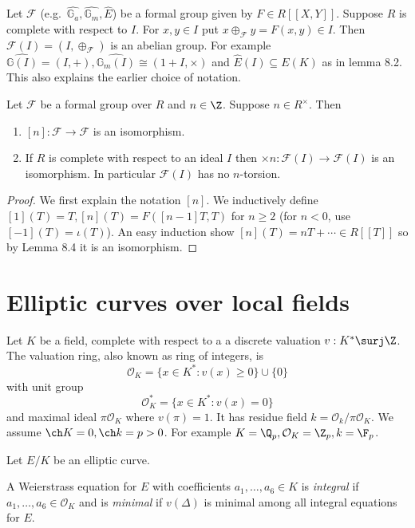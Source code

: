\documentclass[a4paper]{article}
\theoremstyle{definition}
\theoremstyle{theorem}
\renewcommand*{\O}{\mathcal{O}}
\begin{document}
\begin{notation}
  Let \(\mathcal F\) (e.g.\ \(\hat{\mathbb G_a}, \hat{\mathbb G_m}, \hat E\)) be a formal group given by \(F \in R[[X, Y]]\). Suppose \(R\) is complete with respect to \(I\). For \(x, y \in I\) put \(x \oplus_{\mathcal F} y = F(x, y) \in I\). Then \(\mathcal F(I) = (I, \oplus_{\mathcal F})\) is an abelian group. For example \(\hat{\mathbb G(I)} = (I, +), \hat{\mathbb G_m(I)} \cong (1 + I, \times)\) and \(\hat E(I) \subseteq E(K)\) as in lemma 8.2. This also explains the earlier choice of notation.
\end{notation}

\begin{corollary}
  Let \(\mathcal F\) be a formal group over \(R\) and \(n \in \Z\). Suppose \(n \in R^\times\). Then
  \begin{enumerate}
  \item \([n]: \mathcal F \to \mathcal F\) is an isomorphism.
  \item If \(R\) is complete with respect to an ideal \(I\) then \(\times n: \mathcal F(I) \to \mathcal F(I)\) is an isomorphism. In particular \(\mathcal F(I)\) has no \(n\)-torsion.
  \end{enumerate}
\end{corollary}

\begin{proof}
  We first explain the notation \([n]\). We inductively define \([1](T) = T, [n](T) = F([n - 1] T, T)\) for \(n \geq 2\) (for \(n < 0\), use \([-1](T) = \iota(T)\)). An easy induction show \([n](T) = nT + \cdots \in R[[T]]\) so by Lemma 8.4 it is an isomorphism.
\end{proof}

\section{Elliptic curves over local fields}

Let \(K\) be a field, complete with respect to a a discrete valuation \(v: K^* \surj \Z\). The valuation ring, also known as ring of integers, is
\[
  \O_K = \{x \in K^*: v(x) \geq 0\} \cup \{0\}
\]
with unit group
\[
  \O_K^* = \{x \in K^*: v(x) = 0\}
\]
and maximal ideal \(\pi \O_K\) where \(v(\pi) = 1\). It has residue field \(k = \O_k/\pi\O_K\). We assume \(\ch K = 0, \ch k = p > 0\). For example \(K = \Q_p, \O_K = \Z_p, k = \F_p\).

Let \(E/K\) be an elliptic curve.

\begin{definition}
  A Weierstrass equation for \(E\) with coefficients \(a_1, \dots, a_6 \in K\) is \emph{integral} if \(a_1, \dots, a_6 \in \O_K\) and is \emph{minimal} if \(v(\Delta)\) is minimal among all integral equations for \(E\).
\end{definition}
\end{document}

